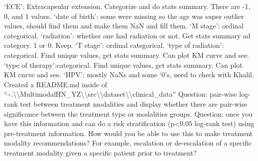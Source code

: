 \documentclass{article}%
\begin{document}
\newline%
%
‘ECE’: Extracapsular extension. Categorize and do stats summary. There are {-}1, 0, and 1 values.%
\newline%
\newline%
%
‘date of birth’: some were missing so the age was super outlier values, should find them and make them NaN and fill them. %
\newline%
\newline%
%
‘M stage’: ordinal categorical. %
\newline%
\newline%
%
‘radiation’: whether one had radiation or not. Get stats summary ad category. 1 or 0. Keep.%
\newline%
\newline%
%
‘T stage’: ordinal categorical. %
\newline%
\newline%
%
‘type of radiation’: categorical. Find unique values, get stats summary. Can plot KM curve and see. %
\newline%
\newline%
%
‘type of therapy’:categorical. Find unique values, get stats summary. Can plot KM curve and see.%
\newline%
\newline%
%
‘HPV’: mostly NaNs and some ‘0’s, need to check with Khalil. %
\newline%
\newline%
%
%
\newline%
\newline%
%
Created a README.md inside of “\textasciitilde{}.\textbackslash{}\textbackslash{}MultimodalHN\_YZ\textbackslash{}\textbackslash{}src\textbackslash{}\textbackslash{}dataset\textbackslash{}\textbackslash{}clinical\_data”%
\newline%
\newline%
%
Question: pair{-}wise log{-}rank test between treatment modalities and display whether there are pair{-}wise significance between the treatment type or modalities groups.%
\newline%
\newline%
%
Question: once you have this information and can do a risk stratification (p<0.05 log{-}rank test) using pre{-}treatment information. How would you be able to use this to make treatment modality recommendations? For example, escalation or de{-}escalation of a specific treatment modality given a specific patient prior to treatment? %
\newline%
\end{document}
